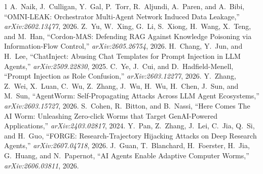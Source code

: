 \documentclass[conference]{IEEEtran}
\begin{document}

\begin{thebibliography}{1}
 A.~Naik, J.~Culligan, Y.~Gal, P.~Torr, R.~Aljundi, A.~Paren, and A.~Bibi, ``OMNI-LEAK: Orchestrator Multi-Agent Network Induced Data Leakage,'' \textit{arXiv:2602.13477}, 2026.
 Z.~Yu, W.~Xing, G.~Li, S.~Xiong, H.~Wang, X.~Teng, and M.~Han, ``Cordon-MAS: Defending RAG Against Knowledge Poisoning via Information-Flow Control,'' \textit{arXiv:2605.26754}, 2026.
 H.~Chang, Y.~Jun, and H.~Lee, ``ChatInject: Abusing Chat Templates for Prompt Injection in LLM Agents,'' \textit{arXiv:2509.22830}, 2025.
 C.~Ye, J.~Cui, and D.~Hadfield-Menell, ``Prompt Injection as Role Confusion,'' \textit{arXiv:2603.12277}, 2026.
 Y.~Zhang, Z.~Wei, X.~Luan, C.~Wu, Z.~Zhang, J.~Wu, H.~Wu, H.~Chen, J.~Sun, and M.~Sun, ``AgentWorm: Self-Propagating Attacks Across LLM Agent Ecosystems,'' \textit{arXiv:2603.15727}, 2026.
 S.~Cohen, R.~Bitton, and B.~Nassi, ``Here Comes The AI Worm: Unleashing Zero-click Worms that Target GenAI-Powered Applications,'' \textit{arXiv:2403.02817}, 2024.
 Y.~Pan, Z.~Zhang, J.~Lei, C.~Jia, Q.~Si, and H.~Guo, ``FORGE: Research-Trajectory Hijacking Attacks on Deep Research Agents,'' \textit{arXiv:2607.04718}, 2026.
 J.~Guan, T.~Blanchard, H.~Foerster, H.~Jia, G.~Huang, and N.~Papernot, ``AI Agents Enable Adaptive Computer Worms,'' \textit{arXiv:2606.03811}, 2026.
\end{thebibliography}
\end{document}
